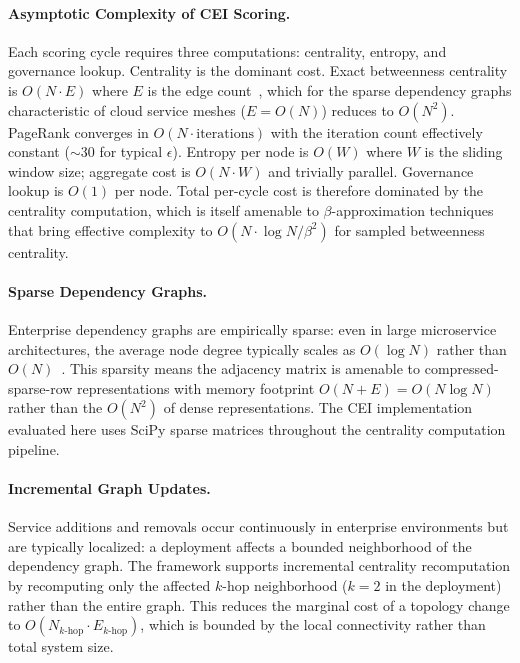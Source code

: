 \documentclass[runningheads]{llncs}
\begin{document}
\paragraph{Asymptotic Complexity of CEI Scoring.}
Each scoring cycle requires three computations: centrality, entropy, and governance lookup. Centrality is the dominant cost. Exact betweenness centrality is $O(N \cdot E)$ where $E$ is the edge count~\cite{brandes_centrality}, which for the sparse dependency graphs characteristic of cloud service meshes ($E = O(N)$) reduces to $O(N^2)$. PageRank converges in $O(N \cdot \text{iterations})$ with the iteration count effectively constant ($\sim$30 for typical $\epsilon$). Entropy per node is $O(W)$ where $W$ is the sliding window size; aggregate cost is $O(N \cdot W)$ and trivially parallel. Governance lookup is $O(1)$ per node. Total per-cycle cost is therefore dominated by the centrality computation, which is itself amenable to $\beta$-approximation techniques~\cite{riondato_centrality} that bring effective complexity to $O(N \cdot \log N / \beta^2)$ for sampled betweenness centrality.

\paragraph{Sparse Dependency Graphs.}
Enterprise dependency graphs are empirically sparse: even in large microservice architectures, the average node degree typically scales as $O(\log N)$ rather than $O(N)$~\cite{borg_omega_kubernetes,verma_kubernetes}. This sparsity means the adjacency matrix is amenable to compressed-sparse-row representations with memory footprint $O(N + E) = O(N \log N)$ rather than the $O(N^2)$ of dense representations. The CEI implementation evaluated here uses SciPy sparse matrices throughout the centrality computation pipeline.

\paragraph{Incremental Graph Updates.}
Service additions and removals occur continuously in enterprise environments but are typically localized: a deployment affects a bounded neighborhood of the dependency graph. The framework supports incremental centrality recomputation by recomputing only the affected $k$-hop neighborhood ($k = 2$ in the deployment) rather than the entire graph. This reduces the marginal cost of a topology change to $O(N_{k\text{-hop}} \cdot E_{k\text{-hop}})$, which is bounded by the local connectivity rather than total system size.
\end{document}
